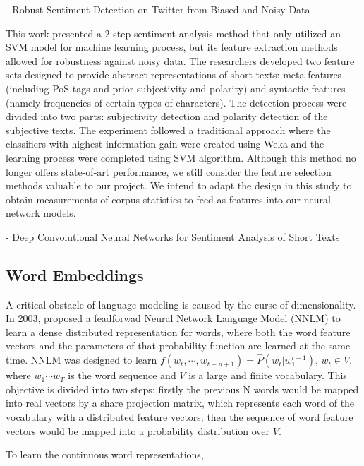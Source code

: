 \documentclass[12pt]{diazessay} %
\begin{document}
- Robust Sentiment Detection on Twitter from Biased and Noisy Data \citep{barbosa2010}

This work presented a 2-step sentiment analysis method that only utilized an SVM model for machine learning process, but its feature extraction methods allowed for robustness against noisy data. The researchers developed two feature sets designed to provide abstract representations of short texts: meta-features (including PoS tags and prior subjectivity and polarity) and syntactic features (namely frequencies of certain types of characters). The detection process were divided into two parts: subjectivity detection and polarity detection of the subjective texts. The experiment followed a traditional approach where the classifiers with highest information gain were created using Weka and the learning process were completed using SVM algorithm. Although this method no longer offers state-of-art performance, we still consider the feature selection methods valuable to our project. We intend to adapt the design in this study to obtain measurements of corpus statistics to feed as features into our neural network models. 

- Deep Convolutional Neural Networks for Sentiment Analysis of Short Texts \citep{santos2014}




\subsection*{Word Embeddings}
A critical obstacle of language modeling is caused by the curse of dimensionality. In 2003, \citep{bengio2003neural} proposed a feadforwad Neural Network Language Model (NNLM) to learn a dense distributed representation\citep{hinton1986learning} for words, where both the word feature vectors and the parameters of that probability function are learned at the same time. NNLM was designed to learn $f \left( w _ { t } , \cdots , w _ { t - n + 1 } \right) = \hat { P } \left( w _ { t } | w _ { 1 } ^ { t - 1 } \right)$, $w _ { t } \in V$, where $w_1 \cdots w_T$ is the word sequence and $V$ is a large and finite vocabulary. This objective is divided into two steps: firstly the previous N words would be mapped into real vectors by a share projection matrix, which represents each word of the vocabulary with a distributed feature vectors; then the sequence of word feature vectors would be mapped into a probability distribution over $V$.

To learn the continuous word representations, \citep{mikolov2013efficient}
\end{document}
